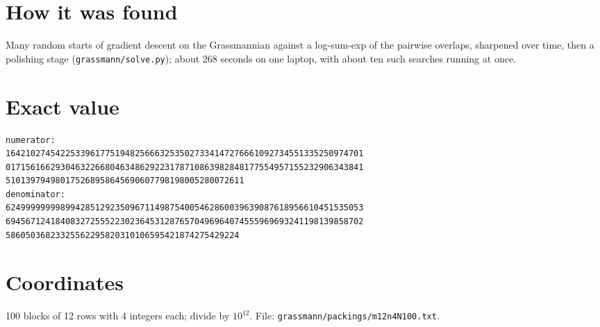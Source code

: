 \documentclass[11pt,a4paper]{article}
\begin{document}
\section{How it was found}
Many random starts of gradient descent on the Grassmannian against a log-sum-exp of the pairwise overlaps, sharpened over time, then a polishing stage (\texttt{grassmann/solve.py}); about 268 seconds on one laptop, with about ten such searches running at once.


\appendix
\section{Exact value}
{\small
\begin{verbatim}
numerator:
164210274542253396177519482566632535027334147276661092734551335250974701
017156166293046322668046348629223178710863982848177554957155232906343841
510139794980175268958645690607798198005280072611
denominator:
624999999998994285129235096711498754005462860039639087618956610451535053
694567124184083272555223023645312876570496964074555969693241198139858702
58605036823325562295820310106595421874275429224
\end{verbatim}}

\section{Coordinates}
100 blocks of 12 rows with 4 integers each; divide by $10^{12}$. File: \texttt{grassmann/packings/m12n4N100.txt}.
{\tiny
\begin{multicols}{3}
\end{multicols}}
\end{document}
